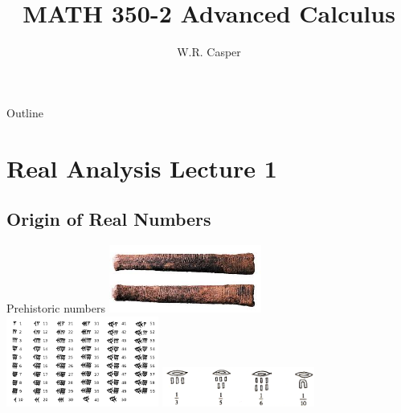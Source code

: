 \documentclass{beamer}
\title{MATH 350-2 Advanced Calculus}
\subtitle
{} %
\author[W.R. Casper] %
{W.R. Casper}
\institute[California State University Fullerton] %
{
  Department of Mathematics\\
  California State University Fullerton}
\begin{document}
\begin{frame}
  \titlepage
\end{frame}

\begin{frame}{Outline}
  \tableofcontents
\end{frame}



\section{Real Analysis Lecture 1}
\subsection{Origin of Real Numbers}

\begin{frame}{Prehistoric numbers}
  \hfil\hfil\includegraphics[width=5cm]{fig/ishango}\newline
  \null\hfil\hfil{}\newline
  \vfil
  \hfil\hfil\includegraphics[width=5cm]{fig/sumerian}\hfil\hfil
    \includegraphics[width=5cm]{fig/egyptian}\vfil
  \null\hfil\hfil{}
    \hfil\hfil{}
\end{frame}
\end{document}
